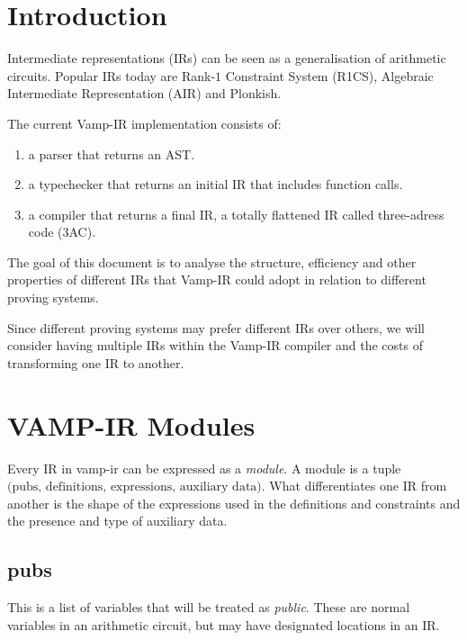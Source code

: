 \documentclass[
    9pt,            %
    techreport,        %
    affiltop,       %
]{art}
\begin{document}
\maketitle
\tableofcontents

\section{Introduction}

Intermediate representations (IRs) can be seen as a generalisation of arithmetic circuits. Popular IRs today are Rank-$1$ Constraint System (R1CS), Algebraic Intermediate Representation (AIR) and Plonkish.

The current Vamp-IR implementation consists of:
\begin{enumerate}
    \item a parser that returns an AST.
    \item a typechecker that returns an initial IR that includes function calls.
    \item a compiler that returns a final IR, a totally flattened IR called three-adress code (3AC).
\end{enumerate} 

The goal of this document is to analyse the structure, efficiency and other properties of different IRs that Vamp-IR could adopt in relation to different proving systems.

Since different proving systems may prefer different IRs over others, we will consider having multiple IRs within the Vamp-IR compiler and the costs of transforming one IR to another.




\section{VAMP-IR Modules}
Every IR in vamp-ir can be expressed as a \textit{module}. A module is a tuple $\text{(pubs, definitions, expressions, auxiliary data)}$.  What differentiates one IR from another is the shape of the expressions used in the definitions and constraints and the presence and type of auxiliary data.

\subsection{pubs}
This is a list of variables that will be treated as \emph{public}. These are normal variables in an arithmetic circuit, but may have designated locations in an IR.
\end{document}
